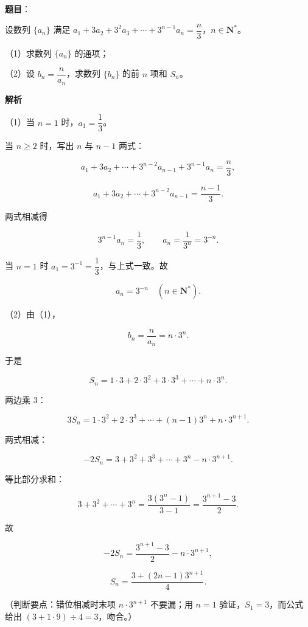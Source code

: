 \begin{answer}

\textbf{题目}：

设数列 $\{a_n\}$ 满足 $a_1+3a_2+3^2a_3+\cdots+3^{n-1}a_n=\dfrac n3$，$n\in\mathbf N^*$。

（1）求数列 $\{a_n\}$ 的通项；

（2）设 $b_n=\dfrac{n}{a_n}$，求数列 $\{b_n\}$ 的前 $n$ 项和 $S_n$。

\textbf{解析}

（1）当 $n=1$ 时，$a_1=\dfrac13$。

当 $n\geqslant2$ 时，写出 $n$ 与 $n-1$ 两式：

\nopagebreak[4]
\[a_1+3a_2+\cdots+3^{n-2}a_{n-1}+3^{n-1}a_n=\frac n3,\]

\nopagebreak[4]
\[a_1+3a_2+\cdots+3^{n-2}a_{n-1}=\frac{n-1}{3}.\]

两式相减得

\nopagebreak[4]
\[3^{n-1}a_n=\frac13,\qquad a_n=\frac{1}{3^n}=3^{-n}.\]

当 $n=1$ 时 $a_1=3^{-1}=\dfrac13$，与上式一致。故

\nopagebreak[4]
\[a_n=3^{-n}\quad(n\in\mathbf N^*).\]

（2）由（1），

\nopagebreak[4]
\[b_n=\frac{n}{a_n}=n\cdot3^n.\]

于是

\nopagebreak[4]
\[S_n=1\cdot3+2\cdot3^2+3\cdot3^3+\cdots+n\cdot3^n.\]

两边乘 $3$：

\nopagebreak[4]
\[3S_n=1\cdot3^2+2\cdot3^3+\cdots+(n-1)3^n+n\cdot3^{n+1}.\]

两式相减：

\nopagebreak[4]
\[-2S_n=3+3^2+3^3+\cdots+3^n-n\cdot3^{n+1}.\]

等比部分求和：

\nopagebreak[4]
\[3+3^2+\cdots+3^n=\frac{3(3^n-1)}{3-1}=\frac{3^{n+1}-3}{2}.\]

故

\nopagebreak[4]
\[-2S_n=\frac{3^{n+1}-3}{2}-n\cdot3^{n+1},\]

\nopagebreak[4]
\[S_n=\frac{3+(2n-1)3^{n+1}}{4}.\]

（判断要点：错位相减时末项 $n\cdot3^{n+1}$ 不要漏；用 $n=1$ 验证，$S_1=3$，而公式给出 $(3+1\cdot9)\div4=3$，吻合。）


\end{answer}
